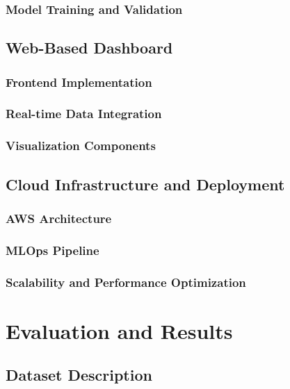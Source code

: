 \documentclass[conference]{IEEEtran}
\begin{document}
\subsubsection{Model Training and Validation}

\subsection{Web-Based Dashboard}

\subsubsection{Frontend Implementation}

\subsubsection{Real-time Data Integration}

\subsubsection{Visualization Components}

\subsection{Cloud Infrastructure and Deployment}

\subsubsection{AWS Architecture}

\subsubsection{MLOps Pipeline}

\subsubsection{Scalability and Performance Optimization}

\section{Evaluation and Results}

\subsection{Dataset Description}
\end{document}
